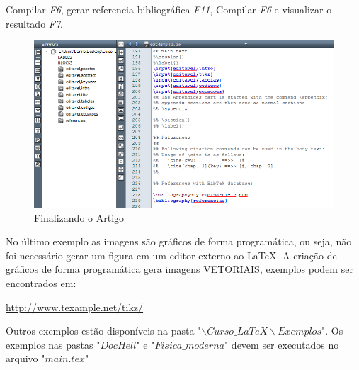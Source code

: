 \begin{frame}[fragile]
Compilar \textit{F6}, gerar referencia bibliográfica \textit{F11},  Compilar \textit{F6} e visualizar o resultado \textit{F7}.
\begin{figure}
\begin{center}
\includegraphics[scale=.5]{figuras/fig5}
\caption{Finalizando o Artigo}
\end{center}
\end{figure}
\end{frame}



\begin{frame}
No último exemplo as imagens são gráficos de forma programática, ou seja,
não foi necessário gerar um figura em um editor externo ao \LaTeX.
A criação de gráficos de forma programática gera imagens VETORIAIS, exemplos podem ser encontrados em:

\vspace*{0.5cm}
\begin{center}
\url{http://www.texample.net/tikz/}
\end{center}
\vspace*{0.5cm}

Outros exemplos estão disponíveis na pasta "$\backslash Curso\_ LaTeX \backslash Exemplos$". 
Os exemplos nas pastas "$DocHell$" e "$Fisica\_moderna$" devem ser executados no arquivo "$main.tex$"
\end{frame}


